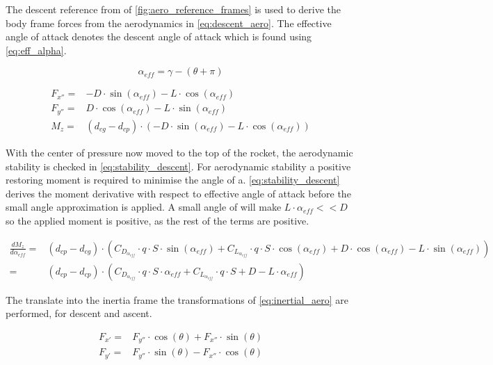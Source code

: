The descent reference from of \autoref{fig:aero_reference_frames} is used to derive the body frame forces from the aerodynamics in \autoref{eq:descent_aero}. The effective angle of attack denotes the descent angle of attack which is found using \autoref{eq:eff_alpha}.

\begin{equation}
    \alpha_{eff} = \gamma - (\theta + \pi)
\label{eq:eff_alpha}
\end{equation}
        
\begin{equation}
\begin{aligned}
    F_{x''} =& -D \cdot \sin(\alpha_{eff}) - L \cdot \cos(\alpha_{eff}) \\
    F_{y''} =& D \cdot \cos(\alpha_{eff}) - L \cdot \sin(\alpha_{eff}) \\
     M_z =& (d_{cg} - d_{cp}) \cdot( -D \cdot \sin(\alpha_{eff}) - L \cdot \cos(\alpha_{eff}))
\end{aligned}
\label{eq:descent_aero}
\end{equation}

With the center of pressure now moved to the top of the rocket, the aerodynamic stability is checked in \autoref{eq:stability_descent}. For aerodynamic stability a positive restoring moment is required to minimise the angle of a. \autoref{eq:stability_descent} derives the moment derivative with respect to effective angle of attack before the small angle approximation is applied. A small angle of will make $L \cdot \alpha_{eff} << D$ so the applied moment is positive, as the rest of the terms are positive.

\begin{equation}
\begin{aligned}
    \frac{dM_z}{d\alpha_{eff}} =& (d_{cp} - d_{cg}) \cdot (C_{D_{\alpha_{eff}}} \cdot q \cdot S \cdot \sin(\alpha_{eff}) + C_{L_{\alpha_{eff}}} \cdot q \cdot S \cdot \cos(\alpha_{eff}) + D \cdot \cos(\alpha_{eff}) - L \cdot \sin(\alpha_{eff})) \\
    =& (d_{cp} - d_{cp}) \cdot (C_{D_{\alpha_{eff}}} \cdot q \cdot S \cdot \alpha_{eff} + C_{L_{\alpha_{eff}}} \cdot q \cdot S + D - L \cdot \alpha_{eff})
\end{aligned}
\label{eq:stability_descent}
\end{equation}

The translate into the inertia frame the transformations of \autoref{eq:inertial_aero} are performed, for descent and ascent.

\begin{equation}
\begin{aligned}
    F_{x'} =& F_{y''} \cdot \cos(\theta) + F_{x''} \cdot \sin(\theta) \\
    F_{y'} =& F_{y''} \cdot \sin(\theta) - F_{x''} \cdot \cos(\theta)
\end{aligned}
\label{eq:inertial_aero}
\end{equation}    

